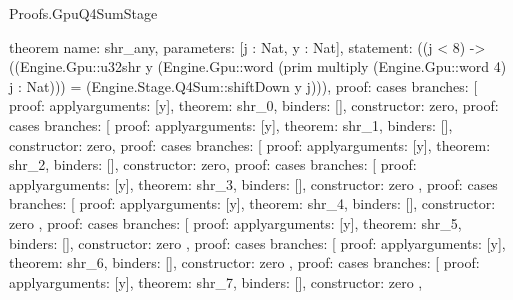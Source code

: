 \begin{lexlean}{Proofs.GpuQ4SumStage}
\begin{semanticmodule}
theorem{
  name: shr_any,
  parameters: [j : Nat, y : Nat],
  statement: ((j < 8) -> ((Engine.Gpu::u32shr y (Engine.Gpu::word (prim multiply (Engine.Gpu::word 4) j : Nat))) = (Engine.Stage.Q4Sum::shiftDown y j))),
  proof: cases{
    branches: [
      {proof: apply{arguments: [y], theorem: shr_0}, binders: [], constructor: zero},
      {
        proof: cases{
          branches: [
            {proof: apply{arguments: [y], theorem: shr_1}, binders: [], constructor: zero},
            {
              proof: cases{
                branches: [
                  {proof: apply{arguments: [y], theorem: shr_2}, binders: [], constructor: zero},
                  {
                    proof: cases{
                      branches: [
                        {
                          proof: apply{arguments: [y], theorem: shr_3},
                          binders: [],
                          constructor: zero
                        },
                        {
                          proof: cases{
                            branches: [
                              {
                                proof: apply{arguments: [y], theorem: shr_4},
                                binders: [],
                                constructor: zero
                              },
                              {
                                proof: cases{
                                  branches: [
                                    {
                                      proof: apply{arguments: [y], theorem: shr_5},
                                      binders: [],
                                      constructor: zero
                                    },
                                    {
                                      proof: cases{
                                        branches: [
                                          {
                                            proof: apply{arguments: [y], theorem: shr_6},
                                            binders: [],
                                            constructor: zero
                                          },
                                          {
                                            proof: cases{
                                              branches: [
                                                {
                                                  proof: apply{arguments: [y], theorem: shr_7},
                                                  binders: [],
                                                  constructor: zero
                                                },
}}}}}}}}}}}}}}}}
\end{semanticmodule}
\end{lexlean}
